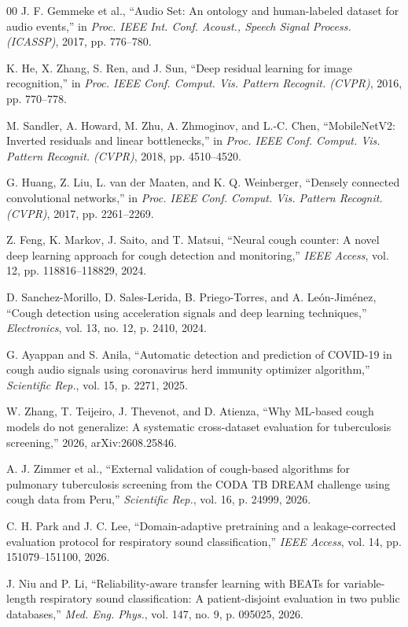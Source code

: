 \begin{thebibliography}{00}
J. F. Gemmeke et al., ``Audio Set: An ontology and human-labeled dataset for audio events,'' in \emph{Proc. IEEE Int. Conf. Acoust., Speech Signal Process. (ICASSP)}, 2017, pp. 776--780.

K. He, X. Zhang, S. Ren, and J. Sun, ``Deep residual learning for image recognition,'' in \emph{Proc. IEEE Conf. Comput. Vis. Pattern Recognit. (CVPR)}, 2016, pp. 770--778.

M. Sandler, A. Howard, M. Zhu, A. Zhmoginov, and L.-C. Chen, ``MobileNetV2: Inverted residuals and linear bottlenecks,'' in \emph{Proc. IEEE Conf. Comput. Vis. Pattern Recognit. (CVPR)}, 2018, pp. 4510--4520.

G. Huang, Z. Liu, L. van der Maaten, and K. Q. Weinberger, ``Densely connected convolutional networks,'' in \emph{Proc. IEEE Conf. Comput. Vis. Pattern Recognit. (CVPR)}, 2017, pp. 2261--2269.

Z. Feng, K. Markov, J. Saito, and T. Matsui, ``Neural cough counter: A novel deep learning approach for cough detection and monitoring,'' \emph{IEEE Access}, vol. 12, pp. 118816--118829, 2024.

D. Sanchez-Morillo, D. Sales-Lerida, B. Priego-Torres, and A. Le{\'o}n-Jim{\'e}nez, ``Cough detection using acceleration signals and deep learning techniques,'' \emph{Electronics}, vol. 13, no. 12, p. 2410, 2024.

G. Ayappan and S. Anila, ``Automatic detection and prediction of COVID-19 in cough audio signals using coronavirus herd immunity optimizer algorithm,'' \emph{Scientific Rep.}, vol. 15, p. 2271, 2025.

W. Zhang, T. Teijeiro, J. Thevenot, and D. Atienza, ``Why ML-based cough models do not generalize: A systematic cross-dataset evaluation for tuberculosis screening,'' 2026, arXiv:2608.25846.

A. J. Zimmer et al., ``External validation of cough-based algorithms for pulmonary tuberculosis screening from the CODA TB DREAM challenge using cough data from Peru,'' \emph{Scientific Rep.}, vol. 16, p. 24999, 2026.

C. H. Park and J. C. Lee, ``Domain-adaptive pretraining and a leakage-corrected evaluation protocol for respiratory sound classification,'' \emph{IEEE Access}, vol. 14, pp. 151079--151100, 2026.

J. Niu and P. Li, ``Reliability-aware transfer learning with BEATs for variable-length respiratory sound classification: A patient-disjoint evaluation in two public databases,'' \emph{Med. Eng. Phys.}, vol. 147, no. 9, p. 095025, 2026.


\end{thebibliography}

